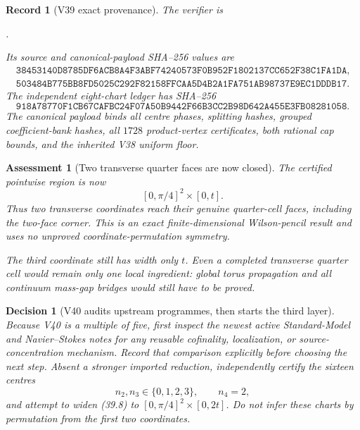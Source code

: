 \documentclass[11pt,oneside]{article}
\newtheorem{assessment}[theorem]{Assessment}
\newtheorem{record}[theorem]{Record}
\newtheorem{decision}[theorem]{Decision}
\theoremstyle{definition}
\theoremstyle{remark}
\begin{document}
\begin{record}[V39 exact provenance]
\label{rec:newv39-provenance}
The verifier is
\begin{center}
\footnotesize
{}.
\end{center}
Its source and canonical-payload SHA--256 values are
\[
\begin{gathered}
\texttt{38453140D8785DF6ACB8A4F3ABF74240573F0B952F1802137CC652F38C1FA1DA},\\
\texttt{503484B775BB8FD5025C292F82158FFCAA5D4B2A1FA751AB98737E9EC1DDDB17}.
\end{gathered}                                         \tag{39.15}
\]
The independent eight-chart ledger has SHA--256
\[
\texttt{918A78770F1CB67CAFBC24F07A50B9442F66B3CC2B98D642A455E3FB08281058}.
                                                               \tag{39.16}
\]
The canonical payload binds all centre phases, splitting hashes,
grouped coefficient-bank hashes, all \(1728\) product-vertex
certificates, both rational cap bounds, and the inherited V38
uniform floor.
\end{record}

\begin{assessment}[Two transverse quarter faces are now closed]
\label{ass:newv39}
The certified pointwise region is now
\[
 [0,\pi/4]^2\times[0,t].
\]
Thus two transverse coordinates reach their genuine quarter-cell
faces, including the two-face corner.  This is an exact
finite-dimensional Wilson-penc\-il result and uses no unproved
coordinate-permutation symmetry.

The third coordinate still has width only \(t\).  Even a completed
transverse quarter cell would remain only one local ingredient:
global torus propagation and all continuum mass-gap bridges would
still have to be proved.
\end{assessment}

\begin{decision}[V40 audits upstream programmes, then starts the third layer]
\label{dec:newv39-next}
Because V40 is a multiple of five, first inspect the newest active
Standard-Model and Navier--Stokes notes for any reusable
cofinality, localization, or source-concentration mechanism.
Record that comparison explicitly before choosing the next step.
Absent a stronger imported reduction, independently certify the
sixteen centres
\[
 n_2,n_3\in\{0,1,2,3\},\qquad n_4=2,                  \tag{39.17}
\]
and attempt to widen (39.8) to
\([0,\pi/4]^2\times[0,2t]\).  Do not infer these charts by
permutation from the first two coordinates.
\end{decision}
\end{document}
